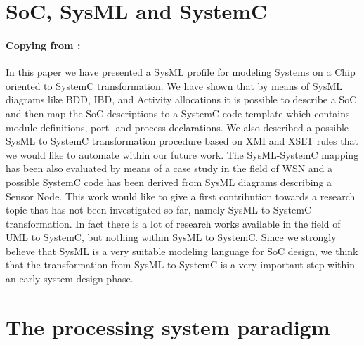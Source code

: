 \documentclass[a4paper,12pt,twoside]{report}
\begin{document}
		\section{SoC, SysML and SystemC}
			\paragraph{Copying from \cite{SoCSysMLSystemC} : } {In this paper we have presented a SysML profile for modeling Systems on a Chip oriented to SystemC transformation. We have shown that by means of SysML diagrams like BDD, IBD, and Activity allocations it is possible to describe a SoC and then map the SoC descriptions to a SystemC code template which contains module definitions, port- and process declarations. We also described a possible SysML to SystemC transformation procedure based on XMI and XSLT rules that we would like to automate within our future work. The SysML-SystemC mapping has been also evaluated by means of a case study in the field of WSN and a possible SystemC code has been derived from SysML diagrams describing a Sensor Node. This work would like to give a first contribution towards a research topic that has not been investigated so far, namely SysML to SystemC transformation. In fact there is a lot of research works available in the field of UML to SystemC, but nothing within SysML to SystemC. Since we strongly believe that SysML is a very suitable modeling language for SoC design, we think that the transformation from SysML to SystemC is a very important step within an early system design phase.
			}

		\section{The processing system paradigm}
\end{document}
